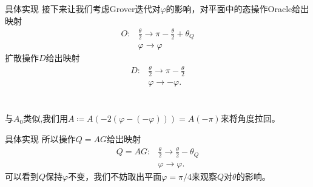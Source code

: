 \documentclass{beamer}
\begin{document}
\begin{frame}{具体实现}
    接下来让我们考虑Grover迭代对$\varphi$的影响，对平面中的态操作Oracle给出映射
    \begin{equation}
        \begin{split}
            O\colon & \frac{\theta}{2}\to\pi-\frac{\theta}{2}+\theta_{Q} \\
                    & \varphi\to\varphi
        \end{split}
    \end{equation}
    扩散操作$D$给出映射
    \begin{equation}
        \begin{split}
            D\colon & \frac{\theta}{2}\to\pi-\frac{\theta}{2} \\
                    & \varphi\to-\varphi.
        \end{split}
    \end{equation}
    \\~\\

    与$A_{0}$类似,我们用$A\coloneqq A(-2(\varphi-(-\varphi)))=A(-\pi)$来将角度拉回。
\end{frame}

\begin{frame}{具体实现}
    所以操作$Q=AG$给出映射
    \begin{equation}
        \begin{split}
            Q=AG\colon & \frac{\theta}{2}\to\frac{\theta}{2}-\theta_{Q} \\
                       & \varphi\to\varphi.
        \end{split}
    \end{equation}
    可以看到$Q$保持$\varphi$不变，我们不妨取出平面$\varphi=\pi/4$来观察$Q$对$\theta$的影响。
\end{frame}
\end{document}
